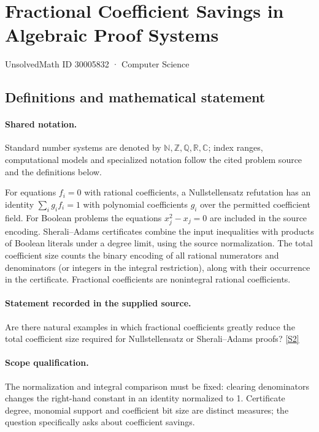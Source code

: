 \documentclass[11pt]{article}
\newcommand{\sref}[2]{\hyperlink{source:#1:#2}{[S#2]}}
\begin{document}
\setcounter{section}{30005831}
\section{Fractional Coefficient Savings in Algebraic Proof Systems}\label{30005832}
{\small\sffamily UnsolvedMath ID 30005832 · Computer Science}
\subsection{Definitions and mathematical statement}

\paragraph{Shared notation.}Standard number systems are denoted by $\mathbb N,\mathbb Z,\mathbb Q,\mathbb R,\mathbb C$; index ranges, computational models and specialized notation follow the cited problem source and the definitions below.


For equations $f_i=0$ with rational coefficients, a Nullstellensatz refutation has an identity $\sum_i g_i f_i=1$ with polynomial coefficients $g_i$ over the permitted coefficient field. For Boolean problems the equations $x_j^2-x_j=0$ are included in the source encoding. Sherali--Adams certificates combine the input inequalities with products of Boolean literals under a degree limit, using the source normalization. The total coefficient size counts the binary encoding of all rational numerators and denominators (or integers in the integral restriction), along with their occurrence in the certificate. Fractional coefficients are nonintegral rational coefficients.
\paragraph{Statement recorded in the supplied source.}
Are there natural examples in which fractional coefficients greatly reduce the total coefficient size required for Nullstellensatz or Sherali–Adams proofs? \sref{30005832}{2}
\paragraph{Scope qualification.}
The normalization and integral comparison must be fixed: clearing denominators changes the right-hand constant in an identity normalized to 1. Certificate degree, monomial support and coefficient bit size are distinct measures; the question specifically asks about coefficient savings.
\end{document}

